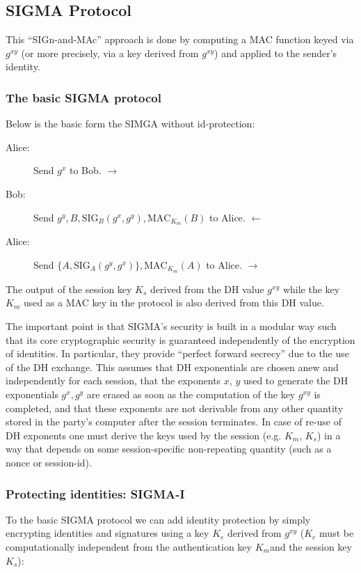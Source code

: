 \documentclass[11pt]{article}
\newcommand{\sig}{\text{SIG}}
\newcommand{\mac}{\text{MAC}}
\begin{document}
\subsection{SIGMA Protocol}
This ``SIGn-and-MAc'' approach is done by computing a MAC function keyed via $g^{xy}$ (or more precisely, via a key derived from $g^{xy}$) and applied to the sender's identity.

\subsubsection{The basic SIGMA protocol}
Below is the basic form the SIMGA without id-protection:
\begin{description}
\item[Alice:] Send $g^x$ to Bob. $\longrightarrow$
\item[Bob:] Send $g^y, B, \sig_B(g^x, g^y), \mac_{K_m}(B)$ to Alice.  $\longleftarrow$
\item[Alice:] Send $\{A, \sig_A(g^y, g^x)\}, \mac_{K_m}(A)$ to Alice. $\longrightarrow$
\end{description}
The output of the session key $K_s$ derived from the DH value $g^{xy}$ while the key $K_m$ used as a MAC key in the protocol is also derived from this DH value.

The important point is that SIGMA's security is built in a modular way such that its core cryptographic security is guaranteed independently of the encryption of identities.
In particular, they provide ``perfect forward secrecy” due to the use of the DH exchange. This assumes that DH exponentials are chosen anew and independently for each session, that the exponents $x$, $y$ used to generate the DH exponentials $g^x, g^y$ are erased as soon as the computation of the key $g^{xy}$ is completed, and that these exponents are not derivable from any other quantity stored in the party’s computer after the session terminates. In case of re-use of DH exponents one must derive the keys used by the session (e.g. $K_m$, $K_s$) in a way that depends on some session-specific non-repeating quantity (such as a nonce or session-id).

\subsubsection{Protecting identities: SIGMA-I}
To the basic SIGMA protocol we can add identity protection by simply encrypting identities and signatures using a key $K_e$ derived from $g^{xy}$ ($K_e$ must be computationally independent from the authentication key $K_m $and the session key $K_s$):
\end{document}
